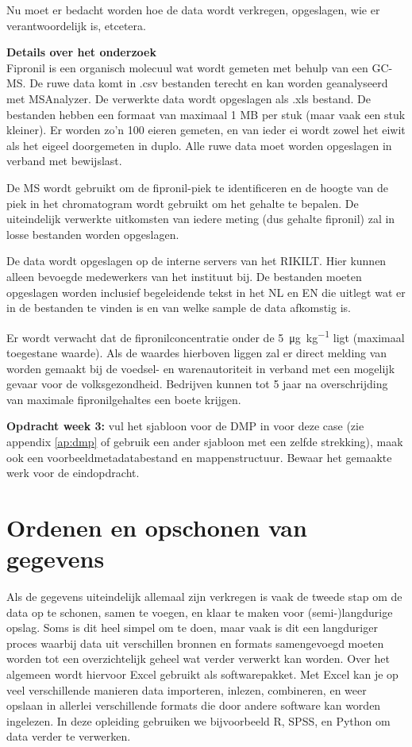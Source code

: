 Nu moet er bedacht worden hoe de data wordt verkregen, opgeslagen, wie er verantwoordelijk is, etcetera.

\textbf{Details over het onderzoek}\\
Fipronil is een organisch molecuul wat wordt gemeten met behulp van een GC-MS. De ruwe data komt in .csv bestanden terecht en kan worden geanalyseerd met MSAnalyzer. De verwerkte data wordt opgeslagen als .xls bestand. De bestanden hebben een formaat van maximaal 1 MB per stuk (maar vaak een stuk kleiner). Er worden zo'n 100 eieren gemeten, en van ieder ei wordt zowel het eiwit als het eigeel doorgemeten in duplo. Alle ruwe data moet worden opgeslagen in verband met bewijslast. 

De MS wordt gebruikt om de fipronil-piek te identificeren en de hoogte van de piek in het chromatogram wordt gebruikt om het gehalte te bepalen. De uiteindelijk verwerkte uitkomsten van iedere meting (dus gehalte fipronil) zal in losse bestanden worden opgeslagen. 

De data wordt opgeslagen op de interne servers van het RIKILT. Hier kunnen alleen bevoegde medewerkers van het instituut bij. De bestanden moeten opgeslagen worden inclusief begeleidende tekst in het NL en EN die uitlegt wat er in de bestanden te vinden is en van welke sample de data afkomstig is. 

Er wordt verwacht dat de fipronilconcentratie onder de \SI[per-mode=symbol]{5}{\micro\gram\per\kilo\gram} ligt (maximaal toegestane waarde). Als de waardes hierboven liggen zal er direct melding van worden gemaakt bij de voedsel- en warenautoriteit in verband met een mogelijk gevaar voor de volksgezondheid. Bedrijven kunnen tot 5 jaar na overschrijding van maximale fipronilgehaltes een boete krijgen. 

\color{saxion}\textbf{Opdracht week 3: }\color{black} vul het sjabloon voor de DMP in voor deze case (zie appendix \ref{ap:dmp} of gebruik een ander sjabloon met een zelfde strekking), maak ook een voorbeeldmetadatabestand en mappenstructuur. Bewaar het gemaakte werk voor de eindopdracht.

\newpage
\section{Ordenen en opschonen van gegevens}
Als de gegevens uiteindelijk allemaal zijn verkregen is vaak de tweede stap om de data op te schonen, samen te voegen, en klaar te maken voor (semi-)langdurige opslag. Soms is dit heel simpel om te doen, maar vaak is dit een langduriger proces waarbij data uit verschillen bronnen en formats samengevoegd moeten worden tot een overzichtelijk geheel wat verder verwerkt kan worden.
Over het algemeen wordt hiervoor Excel gebruikt als softwarepakket. Met Excel kan je op veel verschillende manieren data importeren, inlezen, combineren, en weer opslaan in allerlei verschillende formats die door andere software kan worden ingelezen. In deze opleiding gebruiken we bijvoorbeeld R, SPSS, en Python om data verder te verwerken.

